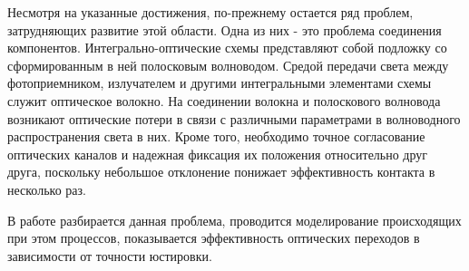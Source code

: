 Несмотря на указанные достижения, по-прежнему остается ряд проблем, затрудняющих развитие этой области. Одна из них - это проблема соединения компонентов. Интегрально-оптические схемы представляют собой подложку со сформированным в ней полосковым волноводом. Средой передачи света между фотоприемником, излучателем и другими интегральными элементами схемы служит оптическое волокно. На соединении волокна и полоскового волновода возникают оптические потери в связи с различными параметрами в волноводного  распространения света в них. Кроме того, необходимо точное согласование оптических каналов и надежная фиксация их положения относительно друг друга, поскольку небольшое отклонение понижает эффективность контакта в несколько раз. 

В работе разбирается данная проблема, проводится моделирование происходящих при этом процессов, показывается эффективность оптических переходов в зависимости от точности юстировки.